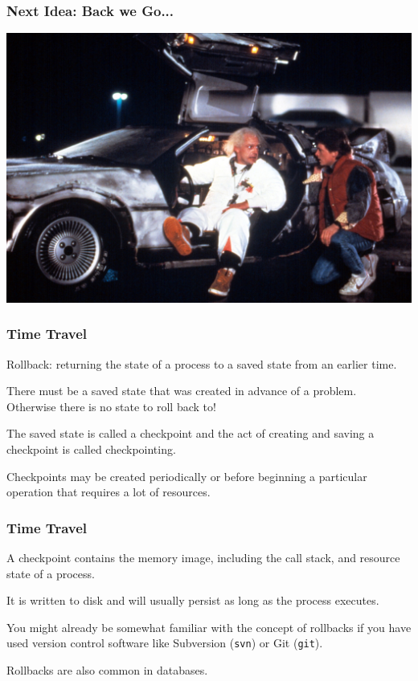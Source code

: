 \begin{frame}
	\frametitle{Next Idea: Back we Go...}

	\begin{center}
		\includegraphics[width=\textwidth]{images/bttf.jpg}
	\end{center}

\end{frame}


\begin{frame}
	\frametitle{Time Travel}

	\alert{Rollback}: returning the state of a process to a saved state from an earlier time.

	There must be a saved state that was created in advance of a problem. \\
	\quad Otherwise there is no state to roll back to!

	The saved state is called a \alert{checkpoint} and the act of creating and saving a checkpoint is called \alert{checkpointing}.

	Checkpoints may be created periodically or before beginning a particular operation that requires a lot of resources.

\end{frame}

\begin{frame}
	\frametitle{Time Travel}

	A checkpoint contains the memory image, including the call stack, and resource state of a process.

	It is written to disk and will usually persist as long as the process executes.

	You might already be somewhat familiar with the concept of rollbacks if you have used version control software like Subversion (\texttt{svn}) or Git (\texttt{git}).

	Rollbacks are also common in databases.

\end{frame}

